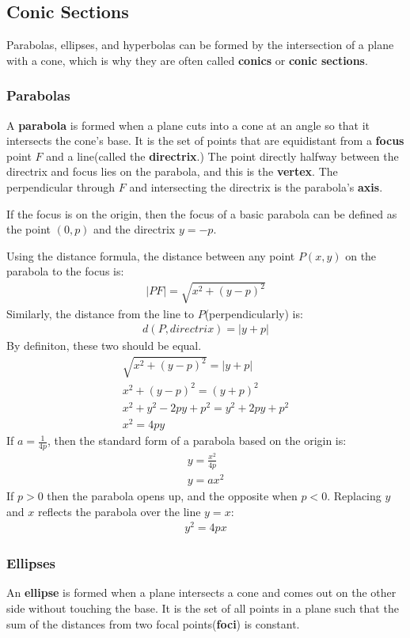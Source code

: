 \documentclass{article}
\begin{document}
\subsection{Conic Sections}
Parabolas, ellipses, and hyperbolas can be formed by the intersection of a plane with a cone, which is why they are often called \textbf{conics} or \textbf{conic sections}.
\subsubsection{Parabolas}
A \textbf{parabola} is formed when a plane cuts into a cone at an angle so that it intersects the cone's base. It is the set of points that are equidistant from a \textbf{focus} point $F$ and a line(called the \textbf{directrix}.) The point directly halfway between the directrix and focus lies on the parabola, and this is the \textbf{vertex}. The perpendicular through $F$ and intersecting the directrix is the parabola's \textbf{axis}.

If the focus is on the origin, then the focus of a basic parabola can be defined as the point $(0,p)$ and the directrix $y=-p$.

Using the distance formula, the distance between any point $P(x,y)$ on the parabola to the focus is:
\begin{gather*}
    |PF| = \sqrt{x^2 + (y-p)^2}
\end{gather*}
Similarly, the distance from the line to $P$(perpendicularly) is:
\begin{gather*}
    d(P,directrix) = |y+p|
\end{gather*}
By definiton, these two should be equal.
\begin{gather*}
    \sqrt{x^2 + (y-p)^2} = |y+p|\\
    x^2 + (y-p)^2 = (y+p)^2\\
    x^2 + y^2 -2py + p^2 = y^2 + 2py + p^2\\
    x^2 = 4py
\end{gather*}
If $a = \frac{1}{4p}$, then the standard form of a parabola based on the origin is:
\begin{gather*}
    y = \frac{x^2}{4p}\\
    y = ax^2
\end{gather*}
If $p > 0$ then the parabola opens up, and the opposite when $p < 0$. Replacing $y$ and $x$ reflects the parabola over the line $y=x$:
\begin{gather*}
    y^2 = 4px
\end{gather*}
\subsubsection{Ellipses}
An \textbf{ellipse} is formed when a plane intersects a cone and comes out on the other side without touching the base. It is the set of all points in a plane such that the sum of the distances from two focal points(\textbf{foci}) is constant.
\end{document}
